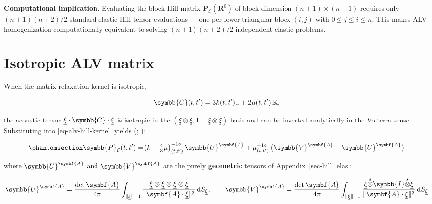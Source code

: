 \documentclass[
  a4paper,
  numbers=noendperiod,
  DIV=12]{scrreprt}
\newcommand{\uu}[1]{{\symbf{{#1}}}}
\newcommand{\uuuu}[1]{{\symbb{{#1}}}}
\newcommand{\uv}[1]{{\underline{{#1}}}}
\newcommand{\sotimes}{{\stackrel{s}{\otimes}}}
\newcommand{\ud}{{\,\mathrm{d}}}
\newcommand{\volt}[1]{{#1}^{-1\circ}}
\begin{document}
\begin{tcolorbox}[enhanced jigsaw, arc=.35mm, bottomrule=.15mm, bottomtitle=1mm, breakable, colback=white, colbacktitle=quarto-callout-important-color!10!white, colframe=quarto-callout-important-color-frame, coltitle=black, left=2mm, leftrule=.75mm, opacityback=0, opacitybacktitle=0.6, rightrule=.15mm, title=\textcolor{quarto-callout-important-color}{\faExclamation}\hspace{0.5em}{Important}, titlerule=0mm, toprule=.15mm, toptitle=1mm]

\textbf{Computational implication.} Evaluating the block Hill matrix
\(\mathbf{P}_\mathcal{E}(\mathbf{R}^0)\) of block-dimension
\((n+1)\times(n+1)\) requires only \((n+1)(n+2)/2\) standard elastic
Hill tensor evaluations --- one per lower-triangular block \((i,j)\)
with \(0\le j\le i\le n\). This makes ALV homogenization computationally
equivalent to solving \((n+1)(n+2)/2\) independent elastic problems.

\end{tcolorbox}

\section{Isotropic ALV matrix}\label{isotropic-alv-matrix}

When the matrix relaxation kernel is isotropic,

\[
\uuuu{C}(t,t') = 3k(t,t')\,\mathbb{J} + 2\mu(t,t')\,\mathbb{K},
\]

the acoustic tensor \(\uv{\xi}\cdot\uuuu{C}\cdot\uv{\xi}\) is isotropic
in the \((\uv{\xi}\otimes\uv{\xi},\,\uu{I}-\uv{\xi}\otimes\uv{\xi})\)
basis and can be inverted analytically in the Volterra sense.
Substituting into \ref{eq-alv-hill-kernel} yields
(;
):

\begin{equation}\protect\phantomsection\label{eq-alv-hill-iso}{
\uuuu{P}_\mathcal{E}(t,t') =
\volt{\!\left(k + \tfrac{4}{3}\mu\right)}_{(t,t')}\,\uuuu{U}^{\uu{A}}
+ \volt{\mu}_{(t,t')}\,\bigl(\uuuu{V}^{\uu{A}} - \uuuu{U}^{\uu{A}}\bigr)
}\end{equation}

where \(\uuuu{U}^{\uu{A}}\) and \(\uuuu{V}^{\uu{A}}\) are the purely
\textbf{geometric} tensors of Appendix~\ref{sec-hill_elas}:

\[
\uuuu{U}^{\uu{A}} = \frac{\det\uu{A}}{4\pi}\int_{\|\uv{\xi}\|=1}
\frac{\uv{\xi}\otimes\uv{\xi}\otimes\uv{\xi}\otimes\uv{\xi}}{\|\uu{A}\cdot\uv{\xi}\|^3}\ud S_{\uv{\xi}},
\qquad
\uuuu{V}^{\uu{A}} = \frac{\det\uu{A}}{4\pi}\int_{\|\uv{\xi}\|=1}
\frac{\uv{\xi}\sotimes\uuuu{I}\sotimes\uv{\xi}}{\|\uu{A}\cdot\uv{\xi}\|^3}\ud S_{\uv{\xi}}
\]
\end{document}
